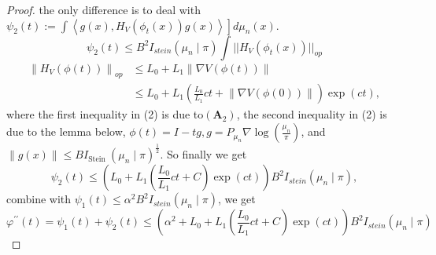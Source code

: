 \documentclass[12pt,a4paper]{article}
\begin{document}
	\begin{proof}
		the only difference is to deal with $\psi_2(t):=\int\left.\left\langle g(x), H_{V}\left(\phi_{t}(x)\right) g(x)\right\rangle\right] d\mu_{n}(x) $.
		\begin{equation}
			\psi_2(t)\leq B^2I_{stein}(\mu_n\mid \pi)\int ||H_V(\phi_t(x))||_{op}
		\end{equation}
		\begin{equation}
			\begin{aligned}
				\left\| H_V (\phi(t))\right\|_{op} & \leq L_{0}+L_{1}\|\nabla V(\phi(t))\| \\
				& \leq L_{0}+L_{1}\left(\frac{L_{0}}{L_{1}} c t+\left\|\nabla V\left(\phi(0)\right)\right\|\right) \exp (c t),
			\end{aligned}
		\end{equation}
	where the first inequality in (2) is due to$ (\mathbf{A}_{2})$, the second inequality in (2) is due to the lemma below, $\phi(t)=I-tg, g=P_{\mu_{n}} \nabla \log \left(\frac{\mu_{n}}{\pi}\right)$, and $\|g(x)\| \leq B I_{\text {Stein }}\left(\mu_{n} \mid \pi\right)^{\frac{1}{2}}$. So finally we get
	\begin{equation}
		\psi_2(t)\leq (L_{0}+L_{1}\left(\frac{L_{0}}{L_{1}} c t+C\right) \exp (c t))B^2I_{stein}(\mu_n\mid \pi),
	\end{equation}
	combine with $\psi_1(t)\leq \alpha^2B^2I_{stein}(\mu_n\mid \pi)$, we get 
	\begin{equation}
		\varphi^{\prime \prime}(t)=\psi_{1}(t)+\psi_{2}(t)\leq (\alpha^2 +L_{0}+L_{1}\left(\frac{L_{0}}{L_{1}} c t+C\right) \exp (c t))B^2I_{stein}(\mu_n\mid \pi)
	\end{equation}
	\end{proof}
\end{document}
